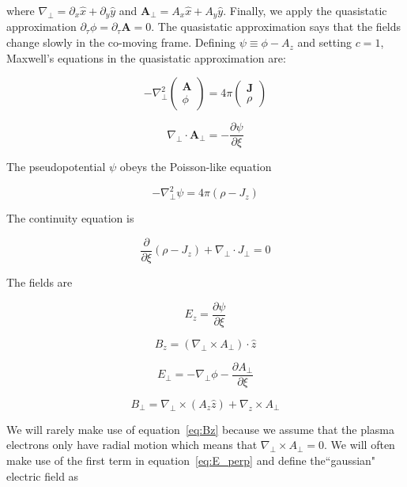 \documentclass[aps,prl,preprint,groupedaddress]{revtex4-1}
\newcommand{\webvector}[2]{\left( \begin{array}{c} #1 \\ #2 \end{array} \right)}
\begin{document}
where $\nabla_\perp = \partial_x \hat x + \partial_y \hat y$ and $\mathbf{A}_\perp = A_x \hat x + A_y \hat y$. Finally, we apply the quasistatic approximation $\partial_\tau \phi = \partial_\tau \mathbf{A} = 0$. The quasistatic approximation says that the fields change slowly in the co-moving frame. Defining $\psi \equiv \phi - A_z$ and setting $c = 1$, Maxwell's equations in the quasistatic approximation are:

\begin{equation}\label{eq:max_qs}
-\nabla^2_\perp \webvector{\mathbf{A}}{\phi} = 4\pi \webvector{\mathbf{J}}{\rho}
\end{equation}

\begin{equation}\label{eq:gauge_qs}
\nabla_\perp \cdot \mathbf{A}_\perp = -\frac{\partial \psi}{\partial \xi}
\end{equation}

The pseudopotential $\psi$ obeys the Poisson-like equation

\begin{equation}\label{eq:Poisson}
-\nabla^2_\perp \psi = 4\pi(\rho - J_z)
\end{equation}

The continuity equation is

\begin{equation}\label{eq:Cont}
\frac{\partial}{\partial \xi} (\rho - J_z) + \nabla_\perp \cdot J_\perp = 0
\end{equation}

The fields are 

\begin{equation}\label{eq:Ez}
E_z = \frac{\partial \psi}{\partial \xi}
\end{equation} 

\begin{equation}\label{eq:Bz}
B_z = (\nabla_\perp \times A_\perp)\cdot \hat{z}
\end{equation} 

\begin{equation}\label{eq:E_perp}
E_\perp = -\nabla_\perp \phi - \frac{\partial A_\perp}{\partial \xi}
\end{equation}

\begin{equation}\label{eq:B_perp}
B_\perp = \nabla_\perp \times (A_z \hat{z}) + \nabla_z \times A_\perp
\end{equation}

We will rarely make use of equation~\ref{eq:Bz} because we assume that the plasma electrons only have radial motion which means that $\nabla_\perp \times A_\perp = 0$. We will often make use of the first term in equation~\ref{eq:E_perp} and define the``gaussian" electric field as
\end{document}
